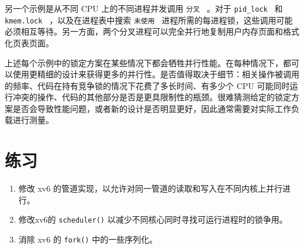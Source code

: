 \documentclass[UTF8]{article}
\begin{document}
另一个示例是从不同 CPU 上的不同进程并发调用  {    \tt    分叉   } 。对于  {    \tt    pid\_lock   }  和  {    \tt    kmem.lock   }  ，以及在进程表中搜索  {    \tt    未使用   }  进程所需的每进程锁，这些调用可能必须相互等待。另一方面，两个分叉进程可以完全并行地复制用户内存页面和格式化页表页面。  

上述每个示例中的锁定方案在某些情况下都会牺牲并行性能。在每种情况下，都可以使用更精细的设计来获得更多的并行性。是否值得取决于细节：相关操作被调用的频率、代码在持有竞争锁的情况下花费了多长时间、有多少个 CPU 可能同时运行冲突的操作、代码的其他部分是否是更具限制性的瓶颈。很难猜测给定的锁定方案是否会导致性能问题，或者新的设计是否明显更好，因此通常需要对实际工作负载进行测量。  

   \section{练习  }     

   \begin{enumerate}


   \item   修改 xv6 的管道实现，以允许对同一管道的读取和写入在不同内核上并行进行。   \item   修改xv6的   \texttt{scheduler()}   以减少不同核心同时寻找可运行进程时的锁争用。   \item   消除 xv6 的    \texttt{fork()}    中的一些序列化。  \end{enumerate}     
\end{document}
